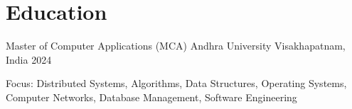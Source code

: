 
\section{Education}

\education
    {Master of Computer Applications (MCA)}
    {Andhra University}
    {Visakhapatnam, India}
    {2024}
    {\item Focus: Distributed Systems, Algorithms, Data Structures, Operating Systems,
     Computer Networks, Database Management, Software Engineering}
